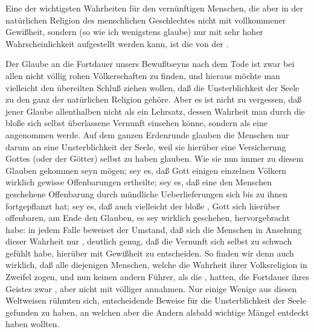 \begin{aufza} 
\item Eine der wichtigsten Wahrheiten für den vernünftigen Menschen, die aber in der natürlichen Religion des menschlichen Geschlechtes nicht mit vollkommener Gewißheit, sondern (so wie ich wenigstens glaube) nur mit sehr hoher Wahrscheinlichkeit aufgestellt werden kann, ist die von der .~
\item Der Glaube an die Fortdauer unsers Bewußtseyns nach dem Tode ist zwar bei allen nicht völlig rohen Völkerschaften zu finden, und hieraus möchte man vielleicht den übereilten Schluß ziehen wollen, daß die Unsterblichkeit der Seele zu den ganz  der natürlichen Religion gehöre. Aber es ist nicht zu vergessen, daß jener Glaube allenthalben nicht als ein Lehrsatz, dessen Wahrheit man durch die bloße sich selbst überlassene Vernunft einsehen könne, sondern als eine  angenommen werde. Auf dem ganzen Erdenrunde glauben die Menschen nur darum an eine Unsterblichkeit der Seele, weil sie hierüber eine Versicherung Gottes (oder der Götter) selbst zu haben glauben. Wie sie nun immer zu diesem Glauben gekommen seyn mögen; sey es, daß Gott einigen einzelnen Völkern wirklich gewisse Offenbarungen ertheilte; sey es, daß eine den  Menschen geschehene Offenbarung durch mündliche Ueberlieferungen sich bis zu ihnen fortgepflanzt hat; sey es, daß auch vielleicht der bloße , Gott  sich hierüber offenbaren, am Ende den Glauben, es sey wirklich geschehen, hervorgebracht habe: in jedem Falle beweiset der Umstand, daß sich die Menschen in Ansehung dieser Wahrheit nur , deutlich genug, daß die Vernunft sich selbst zu schwach gefühlt habe, hierüber mit Gewißheit zu entscheiden. So finden wir denn auch wirklich, daß alle diejenigen Menschen, welche die Wahrheit ihrer Volksreligion in Zweifel zogen, und nun keinen andern Führer, als die , hatten, die Fortdauer ihres Geistes zwar , aber nicht mit völliger  annahmen. Nur einige Wenige aus diesen Weltweisen rühmten sich, entscheidende Beweise für die Unsterblichkeit der Seele gefunden zu haben, an welchen aber die Andern alsbald wichtige Mängel entdeckt haben wollten.
\end{aufza}

